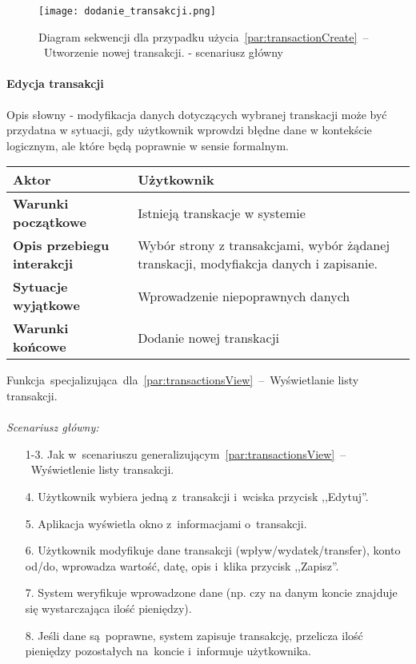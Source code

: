 \begin{figure}[H]
    \texttt{[image: dodanie\_transakcji.png]}
    \caption{Diagram sekwencji dla przypadku użycia~\ref{par:transactionCreate}~--~Utworzenie nowej transakcji.
    - scenariusz główny}
\end{figure}

\paragraph{Edycja transakcji\newline}
\label{par:transactionEdit}
Opis słowny - modyfikacja danych dotyczących wybranej transkacji może być
przydatna w sytuacji, gdy użytkownik wprowdzi błędne dane w kontekście logicznym,
ale które będą poprawnie w sensie formalnym.
\begin{longtable}{|p{5cm}|p{7cm}|}
 	\hline
	\textbf{Aktor} & Użytkownik \\
	\hline
	\textbf{Warunki początkowe} & Istnieją transkacje w systemie
	\\
	\hline
	\textbf{Opis przebiegu interakcji} & Wybór strony z transakcjami, wybór żądanej transkacji,
	modyfiakcja danych i zapisanie.
	\\
	\hline
	\textbf{Sytuacje wyjątkowe} & Wprowadzenie niepoprawnych danych
	\\
	\hline
	\textbf{Warunki końcowe} & Dodanie nowej transkacji
	\\
	\hline
 \end{longtable}
Funkcja~specjalizująca~dla~\ref{par:transactionsView}~--~Wyświetlanie listy transakcji.\\\\
\textit{Scenariusz główny:}
\begin{enumerate}
  \item[1-3.] Jak w~scenariuszu generalizującym~\ref{par:transactionsView}~--~Wyświetlenie listy transakcji.
  \item[4.] Użytkownik wybiera jedną z~transakcji i~wciska przycisk ,,Edytuj''.
  \item[5.] Aplikacja wyświetla okno z~informacjami o~transakcji.
  \item[6.] Użytkownik modyfikuje dane transakcji (wpływ/wydatek/transfer), konto od/do, wprowadza wartość, datę, opis i~klika przycisk ,,Zapisz''.
  \item[7.] System weryfikuje wprowadzone dane (np. czy na danym koncie znajduje się wystarczająca ilość pieniędzy).
  \item[8.] Jeśli dane są~poprawne, system zapisuje transakcję, przelicza ilość pieniędzy pozostałych na~koncie i~informuje użytkownika.
\end{enumerate}

